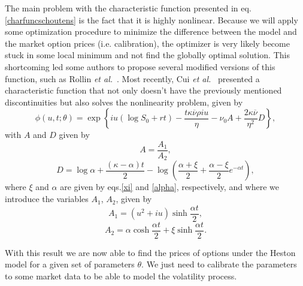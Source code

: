 The main problem with the characteristic function presented in eq.\eqref{charfuncschoutens} is the fact that it is highly nonlinear. Because we will apply some optimization procedure to minimize the difference between the model and the market option prices (i.e. calibration), the optimizer is very likely become stuck in some local minimum and not find the globally optimal solution.
This shortcoming led some authors to propose several modified versions of this function, such as Rollin \textit{et al.}~\citep{Rollin}. Most recently, Cui \textit{et al.}~\citep{Cui} presented a characteristic function that not only doesn't have the previously mentioned discontinuities but also solves the nonlinearity problem, given by
\begin{equation}
\phi(u,t;\theta)=\exp\left\{iu\left(\log S_0+rt\right)-\frac{t\kappa\overline{\nu}\rho iu}{\eta}-\nu_0A+\frac{2\kappa\overline{\nu}}{\eta^2}D\right\},
\end{equation}
\noindent with $A$ and $D$ given by
\begin{equation}
A=\frac{A_1}{A_2},
\end{equation}
\begin{equation}
D=\log \alpha+\frac{(\kappa-\alpha) t}{2}-\log\left(\frac{\alpha+\xi}{2}+\frac{\alpha-\xi}{2}e^{-\alpha t}\right),
\end{equation}
\noindent where $\xi$ and $\alpha$ are given by eqs.\eqref{xi} and \eqref{alpha}, respectively, and where we introduce the variables $A_1$, $A_2$, given by
\begin{equation}
A_1=(u^2+iu)\sinh\frac{\alpha t}{2},
\end{equation}
\begin{equation}
A_2=\alpha\cosh\frac{\alpha t}{2}+\xi\sinh\frac{\alpha t}{2}.
\end{equation}

With this result we are now able to find the prices of options under the Heston model for a given set of parameters $\theta$. We just need to calibrate the parameters to some market data to be able to model the volatility process.

